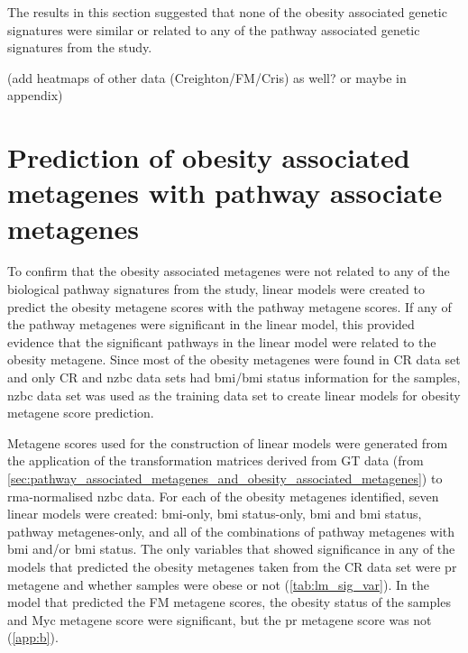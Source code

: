 The results in this section suggested that none of the obesity associated genetic signatures were similar or related to any of the pathway associated genetic signatures from the \citet{Gatza2010a} study.

(add heatmaps of other data (Creighton/FM/Cris) as well? or maybe in appendix)

\section{Prediction of obesity associated metagenes with pathway associate metagenes}
\label{sec:prediction_of_obesity_associated_metagene_with_pathway_associate_metagene}


To confirm that the obesity associated metagenes were not related to any of the biological pathway signatures from the \citet{Gatza2010a} study, linear models were created to predict the obesity metagene scores with the pathway metagene scores.
If any of the pathway metagenes were significant in the linear model, this provided evidence that the significant pathways in the linear model were related to the obesity metagene.
Since most of the obesity metagenes were found in CR data set and only CR and \gls{nzbc} data sets had \gls{bmi}/\gls{bmi} status information for the samples, \gls{nzbc} data set was used as the training data set to create linear models for obesity metagene score prediction.

Metagene scores used for the construction of linear models were generated from the application of the transformation matrices derived from GT data (from \cref{sec:pathway_associated_metagenes_and_obesity_associated_metagenes}) to \gls{rma}-normalised \gls{nzbc} data.
For each of the obesity metagenes identified, seven linear models were created: \gls{bmi}-only, \gls{bmi} status-only, \gls{bmi} and \gls{bmi} status, pathway metagenes-only, and all of the combinations of pathway metagenes with \gls{bmi} and/or \gls{bmi} status.
The only variables that showed significance in any of the models that predicted the obesity metagenes taken from the CR data set were \gls{pr} metagene and whether samples were obese or not (\cref{tab:lm_sig_var}).
In the model that predicted the FM metagene scores, the obesity status of the samples and Myc metagene score were significant, but the \gls{pr} metagene score was not (\cref{app:b}).

